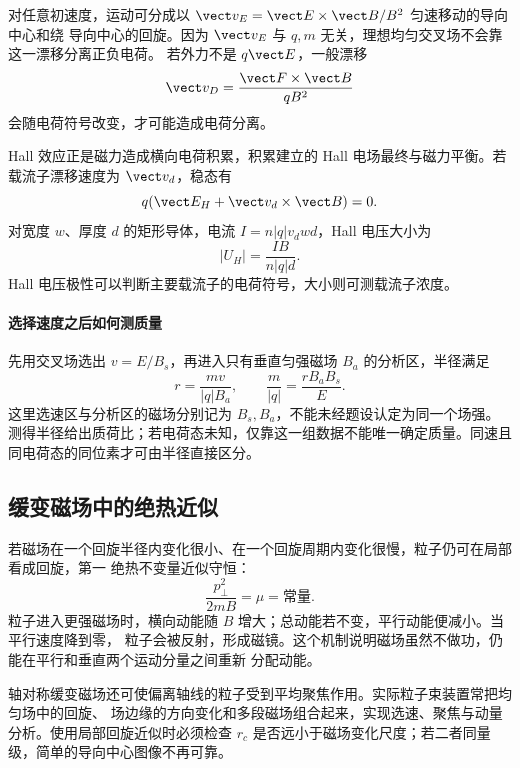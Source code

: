对任意初速度，运动可分成以 $\vect v_E=\vect E\times\vect B/B^2$ 匀速移动的导向中心和绕
导向中心的回旋。因为 $\vect v_E$ 与 $q,m$ 无关，理想均匀交叉场不会靠这一漂移分离正负电荷。
若外力不是 $q\vect E$，一般漂移
\begin{equation}
 \vect v_D=\frac{\vect F\times\vect B}{qB^2}
\end{equation}
会随电荷符号改变，才可能造成电荷分离。

Hall 效应正是磁力造成横向电荷积累，积累建立的 Hall 电场最终与磁力平衡。若载流子漂移速度为
$\vect v_d$，稳态有
\begin{equation}
 q(\vect E_H+\vect v_d\times\vect B)=0.
\end{equation}
对宽度 $w$、厚度 $d$ 的矩形导体，电流 $I=n|q|v_dwd$，Hall 电压大小为
\begin{equation}
 \boxed{|U_H|=\frac{IB}{n|q|d}}.
\end{equation}
Hall 电压极性可以判断主要载流子的电荷符号，大小则可测载流子浓度。


\paragraph{选择速度之后如何测质量}
先用交叉场选出 $v=E/B_s$，再进入只有垂直匀强磁场 $B_a$ 的分析区，半径满足
\[
 r=\frac{mv}{|q|B_a},\qquad
 \frac m{|q|}=\frac{rB_aB_s}{E}.
\]
这里选速区与分析区的磁场分别记为 $B_s,B_a$，不能未经题设认定为同一个场强。测得半径给出质荷比；若电荷态未知，仅靠这一组数据不能唯一确定质量。同速且同电荷态的同位素才可由半径直接区分。

\subsection*{缓变磁场中的绝热近似}

若磁场在一个回旋半径内变化很小、在一个回旋周期内变化很慢，粒子仍可在局部看成回旋，第一
绝热不变量近似守恒：
\begin{equation}
 \boxed{\frac{p_\perp^2}{2mB}=\mu=\text{常量}}.
\end{equation}
粒子进入更强磁场时，横向动能随 $B$ 增大；总动能若不变，平行动能便减小。当平行速度降到零，
粒子会被反射，形成磁镜。这个机制说明磁场虽然不做功，仍能在平行和垂直两个运动分量之间重新
分配动能。

轴对称缓变磁场还可使偏离轴线的粒子受到平均聚焦作用。实际粒子束装置常把均匀场中的回旋、
场边缘的方向变化和多段磁场组合起来，实现选速、聚焦与动量分析。使用局部回旋近似时必须检查
$r_c$ 是否远小于磁场变化尺度；若二者同量级，简单的导向中心图像不再可靠。


